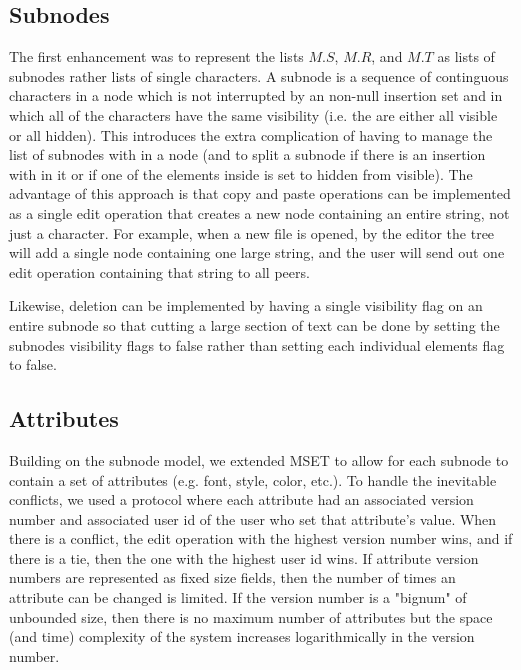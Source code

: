 \documentclass{amsart}
\begin{document}
\subsection{Subnodes}
The first enhancement was to represent the lists $M.S$, $M.R$, and $M.T$ as lists of subnodes rather lists of single characters.  A subnode is a sequence of continguous characters in a node which is not interrupted by an non-null insertion set and in which all of the characters have the same visibility (i.e. the are either all visible or all hidden).  This introduces the extra complication of having to manage the list of subnodes with in a node (and to split a subnode if there is an insertion with in it or if one of the elements inside is set to hidden from visible).  The advantage of this approach is that copy and paste operations can be implemented as a single edit operation that creates a new node containing an entire string, not just a character.
For example, when a new file is opened, by the editor the tree will add a single node
containing one large string, and the user will send out one edit operation containing that string to all peers.

Likewise, deletion can be implemented by having a single visibility flag on an entire subnode so that cutting a large section of text can be done by setting the subnodes visibility flags to false rather than setting each individual elements flag to false.

\subsection{Attributes}
Building on the subnode model, we extended MSET to allow for each subnode to contain a set of attributes (e.g. font, style, color, etc.). To handle the inevitable conflicts, we used a protocol where each attribute had an associated version number and associated user id of the user who set that attribute's value.  When there is a conflict, the edit operation with the highest version number wins, and if there is a tie, then the one with the highest user id wins. If attribute version numbers are
represented as fixed size fields, then the number of times an attribute can be changed is limited.  If the version number is a "bignum" of unbounded size, then there is no maximum number of attributes but the space (and time) complexity of the system increases logarithmically in the version number.
\end{document}
